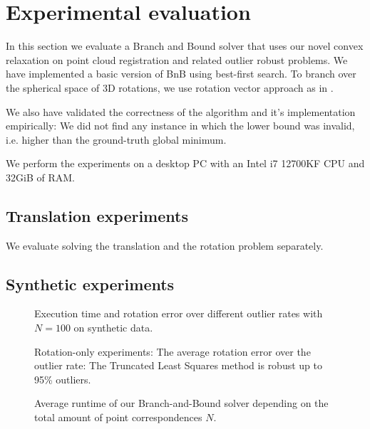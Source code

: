 
\section{Experimental evaluation}
\label{sec:evaluation}
In this section we evaluate a Branch and Bound solver that uses our novel convex relaxation on point cloud registration and related outlier robust problems. We have implemented a basic version of BnB using best-first search. To branch over the spherical space of 3D rotations, we use rotation vector approach as in \cite{10.1007/978-3-642-37444-9_42}.

We also have validated the correctness of the algorithm and it's implementation empirically: We did not find any instance in which the lower bound was invalid, i.e. higher than the ground-truth global minimum. 

We perform the experiments on a desktop PC with an Intel i7 12700KF CPU and 32GiB of RAM.

\subsection{Translation experiments}
We evaluate solving the translation and the rotation problem separately. 

\subsection{Synthetic experiments}
\begin{figure}[!ht]
	\centering
	\caption{Execution time and rotation error over different outlier rates with $N=100$ on synthetic data.}
	\label{fig:execution-time-over-outlier-rate}
\end{figure}


\begin{figure}[!ht]
	\centering
	\caption{Rotation-only experiments: The average rotation error over the outlier rate: The Truncated Least Squares method is robust up to 95\% outliers.}
	\label{fig:rotation-error-over-outlier-rate}
\end{figure}


\begin{figure}[!ht]
	\centering
	\caption{Average runtime of our Branch-and-Bound solver depending on the total amount of point correspondences $N$.}
	\label{fig:runtime}
\end{figure}


